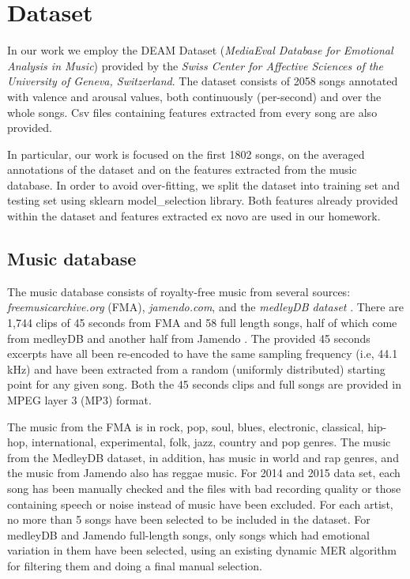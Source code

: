 \section{Dataset}\label{sec:dataset}

In our work we employ the DEAM Dataset (\textit{MediaEval Database for Emotional Analysis in Music}) provided by the \textit{Swiss Center for Affective Sciences of the University of Geneva, Switzerland}.
The dataset consists of 2058 songs annotated with valence and arousal values, both continuously (per-second) and over the whole songs. Csv files containing features extracted from every song are also provided.

In particular, our work is focused on the first 1802 songs, on the averaged annotations of the dataset and on the features extracted from the music database.
In order to avoid over-fitting, we split the dataset into training set and testing set using sklearn model\_selection library.
Both features already provided within the dataset and features extracted ex novo are used in our homework.

\subsection{Music database}\label{sec:database}

The music database consists of royalty-free music from several sources: \textit{freemusicarchive.org} (FMA), \textit{jamendo.com}, and the \textit{medleyDB dataset} \cite{bittner2014medleydb}. There are 1,744 clips of 45 seconds from FMA and 58 full length songs, half of which come from medleyDB and another half from Jamendo \cite{aljanaki2017developing}.
The provided 45 seconds excerpts have all been re-encoded to have the same sampling frequency (i.e, 44.1\,kHz) and have been extracted from a random (uniformly distributed) starting point for any given song. Both the 45 seconds clips and full songs are provided in MPEG layer 3 (MP3) format.\cite{soleymani2016deam}

The music from the FMA is in rock, pop, soul, blues, electronic, classical, hip-hop, international, experimental, folk, jazz, country and pop genres. The music from the MedleyDB dataset, in addition, has music in world and rap genres, and the music from Jamendo also has reggae music. For 2014 and 2015 data set, each song has been manually checked and the files with bad recording quality or those containing speech or noise instead of music have been excluded. For each artist, no more than 5 songs have been selected to be included in the dataset. For medleyDB and Jamendo full-length songs, only songs which had emotional variation in them have been selected, using an existing dynamic MER algorithm for filtering them and doing a final manual selection\cite{anna2015emotion}.


